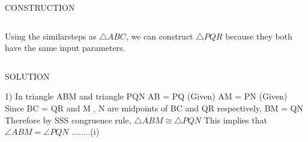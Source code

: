 \documentclass[11pt]{beamer}
\begin{document}
\begin{frame}{CONSTRUCTION}
\begin{columns}
\begin{column}{0.5\textwidth}
\begin{table}[H]
\centering
{}
\caption{\tiny To construct $\triangle ABC$}
\end{table}
Using the similarsteps as $\triangle ABC$, we can construct $\triangle PQR$ because they both have the same input parameters.
\end{column}
\end{columns}

\end{frame}





\begin{frame}{SOLUTION}
    \begin{flushleft}
       
        1) In triangle ABM and triangle PQN
        \newline
        \newline
        AB = PQ  (Given)
        \newline
        AM = PN  (Given)
        \newline
        Since BC = QR and M , N are midpoints of BC and QR respectively, 
        \newline
        BM = QN 
        \newline 
        Therefore by SSS congruence rule, $\triangle  ABM  \cong   \triangle  PQN$ 
        \newline
        \newline
        This implies that $\angle ABM = \angle PQN$    ........(i)

    \end{flushleft}
 

\end{frame}
\end{document}
